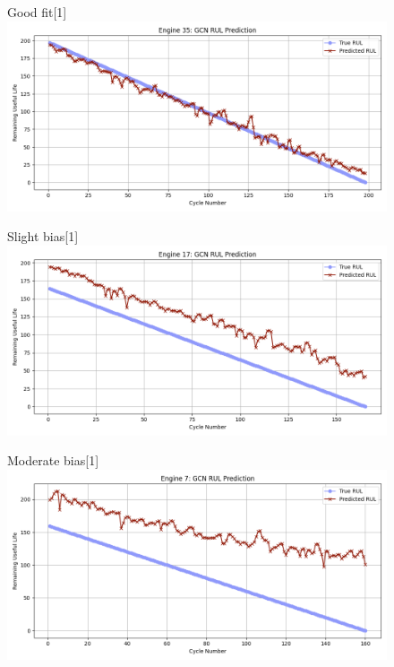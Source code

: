 \documentclass[12pt]{article}
\begin{document}
\begin{figure}[H]
    \centering
    \begin{minipage}[t]{0.48\textwidth}
        \centering
        \begin{subcaptionbox}{Good fit\label{fig_NASA_GCN_eng6}}[1\linewidth]
            {\includegraphics[width=\linewidth]{figures/NASA/NASA_GCN_eng6.png}}
        \end{subcaptionbox}

        \vspace{0.1cm}

        \begin{subcaptionbox}{Slight bias\label{fig_NASA_GCN_eng4}}[1\linewidth]
            {\includegraphics[width=\linewidth]{figures/NASA/NASA_GCN_eng4.png}}
        \end{subcaptionbox}

        \vspace{0.1cm}

        \begin{subcaptionbox}{Moderate bias\label{fig_NASA_GCN_eng2}}[1\linewidth]
            {\includegraphics[width=\linewidth]{figures/NASA/NASA_GCN_eng2.png}}
        \end{subcaptionbox}


\end{minipage}
\end{figure}
\end{document}
